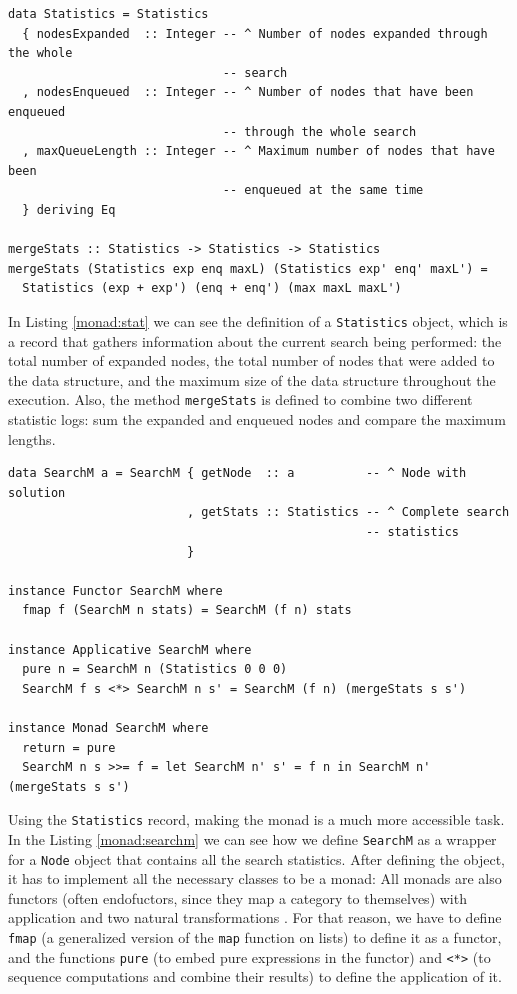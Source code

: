 \begin{lstlisting}[style=haskell, caption=\texttt{Statistics} implementation,
label=monad:stat]
data Statistics = Statistics
  { nodesExpanded  :: Integer -- ^ Number of nodes expanded through the whole
                              -- search
  , nodesEnqueued  :: Integer -- ^ Number of nodes that have been enqueued
                              -- through the whole search
  , maxQueueLength :: Integer -- ^ Maximum number of nodes that have been
                              -- enqueued at the same time
  } deriving Eq

mergeStats :: Statistics -> Statistics -> Statistics
mergeStats (Statistics exp enq maxL) (Statistics exp' enq' maxL') =
  Statistics (exp + exp') (enq + enq') (max maxL maxL')
\end{lstlisting}

In Listing \ref{monad:stat} we can see the definition of a \texttt{Statistics}
object, which is a record that gathers information about the current search
being performed: the total number of expanded nodes, the total number of nodes
that were added to the data structure, and the maximum size of the data
structure throughout the execution. Also, the method \texttt{mergeStats} is
defined to combine two different statistic logs: sum the expanded and enqueued
nodes and compare the maximum lengths.

\begin{lstlisting}[style=haskell, caption=\texttt{SearchM} implementation,
label=monad:searchm]
data SearchM a = SearchM { getNode  :: a          -- ^ Node with solution
                         , getStats :: Statistics -- ^ Complete search
                                                  -- statistics 
                         }

instance Functor SearchM where
  fmap f (SearchM n stats) = SearchM (f n) stats

instance Applicative SearchM where
  pure n = SearchM n (Statistics 0 0 0)
  SearchM f s <*> SearchM n s' = SearchM (f n) (mergeStats s s')

instance Monad SearchM where
  return = pure
  SearchM n s >>= f = let SearchM n' s' = f n in SearchM n' (mergeStats s s')
\end{lstlisting}

Using the \texttt{Statistics} record, making the monad is a much more
accessible task. In the Listing \ref{monad:searchm} we can see how we define
\texttt{SearchM} as a wrapper for a \texttt{Node} object that contains all the
search statistics. After defining the object, it has to implement all the
necessary classes to be a monad: All monads are also functors (often
endofuctors, since they map a category to themselves) with application and two
natural transformations \cite{street-1972-monads}. For that reason, we have to
define \texttt{fmap} (a generalized version of the \texttt{map} function on
lists) to define it as a functor, and the functions \texttt{pure} (to embed
pure expressions in the functor) and \texttt{<*>} (to sequence computations and
combine their results) to define the application of it.\\

